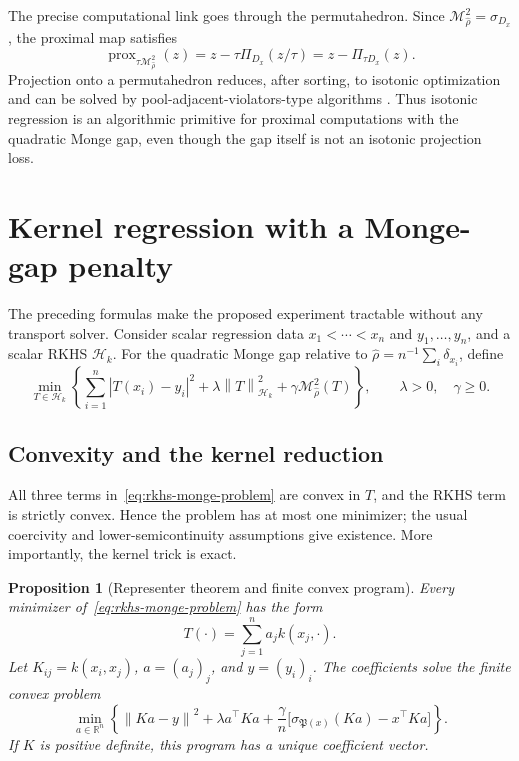 \documentclass[11pt,a4paper]{article}
\newtheorem{proposition}[theorem]{Proposition}
\theoremstyle{definition}
\theoremstyle{remark}
\newcommand{\R}{\mathbb R}
\newcommand{\Mcal}{\mathcal M}
\newcommand{\Hcal}{\mathcal H}
\newcommand{\prox}{\operatorname{prox}}
\newcommand{\norm}[1]{\left\lVert #1\right\rVert}
\newcommand{\abs}[1]{\left\lvert #1\right\rvert}
\newcommand{\Perm}{\mathfrak P}
\begin{document}
The precise computational link goes through the permutahedron. Since
$\Mcal_{\widehat\rho}^2=\sigma_{D_x}$, the proximal map satisfies
\begin{equation}\label{eq:gap-prox-permutahedron}
  \prox_{\tau\Mcal_{\widehat\rho}^2}(z)
  =z-\tau\Pi_{D_x}(z/\tau)
  =z-\Pi_{\tau D_x}(z).
\end{equation}
Projection onto a permutahedron reduces, after sorting, to isotonic
optimization and can be solved by pool-adjacent-violators-type algorithms
\citep{LimWright2016}. Thus isotonic regression is an algorithmic primitive
for proximal computations with the quadratic Monge gap, even though the gap
itself is not an isotonic projection loss.

\section{Kernel regression with a Monge-gap penalty}

The preceding formulas make the proposed experiment tractable without any
transport solver. Consider scalar regression data
$x_1<\cdots<x_n$ and $y_1,\ldots,y_n$, and a scalar RKHS $\Hcal_k$. For the
quadratic Monge gap relative to
$\widehat\rho=n^{-1}\sum_i\delta_{x_i}$, define
\begin{equation}\label{eq:rkhs-monge-problem}
  \min_{T\in\Hcal_k}
  \left\{
    \sum_{i=1}^n\abs{T(x_i)-y_i}^2
    +\lambda\norm{T}_{\Hcal_k}^2
    +\gamma\Mcal_{\widehat\rho}^2(T)
  \right\},
  \qquad \lambda>0,\quad\gamma\geq0.
\end{equation}

\subsection{Convexity and the kernel reduction}

All three terms in~\eqref{eq:rkhs-monge-problem} are convex in $T$, and the
RKHS term is strictly convex. Hence the problem has at most one minimizer; the
usual coercivity and lower-semicontinuity assumptions give existence. More
importantly, the kernel trick is exact.

\begin{proposition}[Representer theorem and finite convex program]
\label{prop:rkhs-representer}
Every minimizer of~\eqref{eq:rkhs-monge-problem} has the form
\begin{equation}\label{eq:representer}
  T(\cdot)=\sum_{j=1}^n a_j k(x_j,\cdot).
\end{equation}
Let $K_{ij}=k(x_i,x_j)$, $a=(a_j)_j$, and $y=(y_i)_i$. The coefficients solve
the finite convex problem
\begin{equation}\label{eq:kernel-finite-program}
  \min_{a\in\R^n}
  \left\{
    \norm{Ka-y}^2+\lambda a^\top Ka
    +\frac{\gamma}{n}
      \bigl[\sigma_{\Perm(x)}(Ka)-x^\top Ka\bigr]
  \right\}.
\end{equation}
If $K$ is positive definite, this program has a unique coefficient vector.
\end{proposition}
\end{document}
